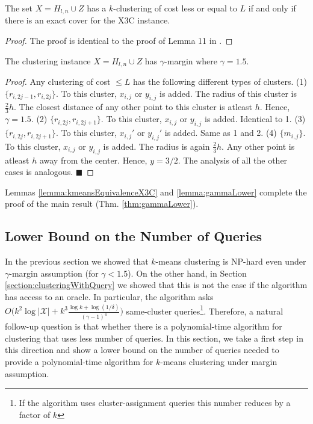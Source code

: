\documentclass[orivec]{llncs}
\newcommand{\mc}{\mathcal}
\renewcommand{\qed}{\hfill\ensuremath{\blacksquare}}
\begin{document}
\begin{lemma}
\label{lemma:kmeansEquivalenceX3C}
The set $X = H_{l,n} \cup Z$ has a $k$-clustering of cost less or equal to $L$ if and only if there is an exact cover for the X3C instance.
\end{lemma}
\begin{proof}
The proof is identical to the proof of Lemma 11 in \cite{vattani2009hardness}.
\end{proof}

\begin{lemma}
\label{lemma:gammaLower}
The clustering instance $X = H_{l,n} \cup Z$ has $\gamma$-margin where $\gamma = 1.5$.
\end{lemma}
\begin{proof}
Any clustering of cost $\le L$ has the following different types of clusters. (1) $\{r_{i,2j-1}, r_{i, 2j}\}$. To this cluster, $x_{i,j}$ or $y_{i,j}$ is added. The radius of this cluster is $\frac{2}{3}h$. The closest distance of any other point to this cluster is atleast $h$. Hence, $\gamma = 1.5$. (2) $\{r_{i,2j}, r_{i, 2j+1}\}$. To this cluster, $x_{i,j}$ or $y_{i,j}$ is added. Identical to 1. 
(3) $\{r_{i,2j}, r_{i, 2j+1}\}$. To this cluster, $x_{i,j}'$ or $y_{i,j}'$ is added. Same as 1 and 2. (4) $\{m_{i,j}\}$. To this cluster, $x_{i,j}$ or $y_{i,j}$ is added. The radius is again $\frac{2}{3}h$. Any other point is atleast $h$ away from the center. Hence, $y= 3/2$. The analysis of all the other cases is analogous.
\qed
\end{proof}
Lemmas \ref{lemma:kmeansEquivalenceX3C} and \ref{lemma:gammaLower} complete the proof of the main result (Thm. \ref{thm:gammaLower}). 

\subsection{Lower Bound on the Number of Queries}

In the previous section we showed that $k$-means clustering is NP-hard even under $\gamma$-margin assumption (for $\gamma < 1.5$). On the other hand, in Section \ref{section:clusteringWithQuery} we showed that this is not the case if the algorithm has access to an oracle. In particular, the algorithm asks $O\big(k^2\log |\mc X| + k^3\frac{\log k + \log (1/\delta)}{(\gamma - 1)^4}\big)$ same-cluster queries\footnote{If the algorithm uses cluster-assignment queries this number reduces by a factor of $k$}. Therefore, a natural follow-up question is that whether there is a polynomial-time algorithm for clustering that uses less number of queries. In this section, we take a first step in this direction and show a lower bound on the number of queries needed to provide a polynomial-time algorithm for $k$-means clustering under margin assumption.
\end{document}
